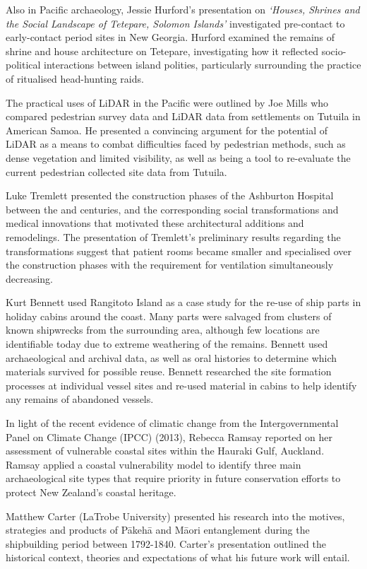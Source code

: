 Also in Pacific archaeology, Jessie Hurford’s presentation on \emph{‘Houses, Shrines and the Social Landscape of Tetepare, Solomon Islands’} investigated pre-contact to early-contact period sites in New Georgia. Hurford examined the remains of shrine and house architecture on Tetepare, investigating how it reflected socio-political interactions between island polities, particularly surrounding the practice of ritualised head-hunting raids.

The practical uses of LiDAR in the Pacific were outlined by Joe Mills who compared pedestrian survey data and LiDAR data from settlements on Tutuila in American Samoa. He presented a convincing argument for the potential of LiDAR as a means to combat difficulties faced by pedestrian methods, such as dense vegetation and limited visibility, as well as being a tool to re-evaluate the current pedestrian collected site data from Tutuila.  

Luke Tremlett presented the construction phases of the Ashburton Hospital between the  and  centuries, and the corresponding social transformations and medical innovations that motivated these architectural additions and remodelings. The presentation of Tremlett’s preliminary results regarding the transformations suggest that patient rooms became smaller and specialised over the construction phases with the requirement for ventilation simultaneously decreasing. 

Kurt Bennett used Rangitoto Island as a case study for the re-use of ship parts in holiday cabins around the coast. Many parts were salvaged from clusters of known shipwrecks from the surrounding area, although few locations are identifiable today due to extreme weathering of the remains. Bennett used archaeological and archival data, as well as oral histories to determine which materials survived for possible reuse. Bennett researched the site formation processes at individual vessel sites and re-used material in cabins to help identify any remains of abandoned vessels.

In light of the recent evidence of climatic change from the Intergovernmental Panel on Climate Change (IPCC) (2013), Rebecca Ramsay reported on her assessment of vulnerable coastal sites within the Hauraki Gulf, Auckland. Ramsay applied a coastal vulnerability model to identify three main archaeological site types that require priority in future conservation efforts to protect New Zealand’s coastal heritage.

Matthew Carter (LaTrobe University) presented his research into the motives, strategies and products of Pākehā and Māori entanglement during the shipbuilding period between 1792-1840. Carter’s presentation outlined the historical context, theories and expectations of what his future work will entail. 


